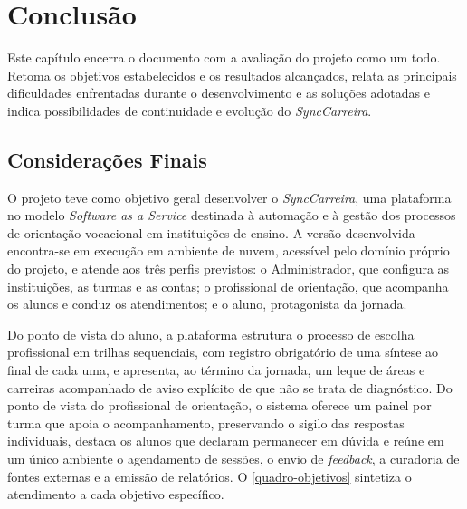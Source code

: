 \chapter{Conclusão}\label{cap:conclusao}

Este capítulo encerra o documento com a avaliação do projeto como um todo. Retoma os objetivos estabelecidos e os resultados alcançados, relata as principais dificuldades enfrentadas durante o desenvolvimento e as soluções adotadas e indica possibilidades de continuidade e evolução do \textit{SyncCarreira}.

\section{Considerações Finais}

O projeto teve como objetivo geral desenvolver o \textit{SyncCarreira}, uma plataforma no modelo \textit{Software as a Service} destinada à automação e à gestão dos processos de orientação vocacional em instituições de ensino. A versão desenvolvida encontra-se em execução em ambiente de nuvem, acessível pelo domínio próprio do projeto, e atende aos três perfis previstos: o Administrador, que configura as instituições, as turmas e as contas; o profissional de orientação, que acompanha os alunos e conduz os atendimentos; e o aluno, protagonista da jornada.

Do ponto de vista do aluno, a plataforma estrutura o processo de escolha profissional em trilhas sequenciais, com registro obrigatório de uma síntese ao final de cada uma, e apresenta, ao término da jornada, um leque de áreas e carreiras acompanhado de aviso explícito de que não se trata de diagnóstico. Do ponto de vista do profissional de orientação, o sistema oferece um painel por turma que apoia o acompanhamento, preservando o sigilo das respostas individuais, destaca os alunos que declaram permanecer em dúvida e reúne em um único ambiente o agendamento de sessões, o envio de \textit{feedback}, a curadoria de fontes externas e a emissão de relatórios. O \autoref{quadro-objetivos} sintetiza o atendimento a cada objetivo específico.

